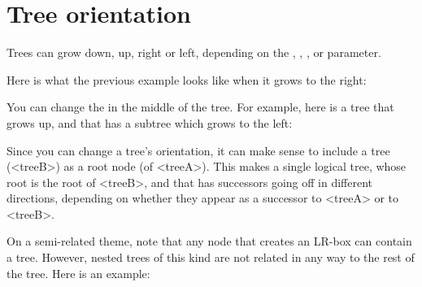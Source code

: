 \documentclass[fontsize=11pt,english,BCOR=10mm,DIV=12,bibliography=totoc,parskip=false,
   headings=small, headinclude=false,footinclude=false,oneside]{pst-doc}
\begin{document}
\section{Tree orientation}

Trees can grow down, up, right or left, depending on the 
, , , or  parameter.

Here is what the previous example looks like when it grows to the right:

\begin{LTXexample}[pos=l,width=0.4\linewidth]
\end{LTXexample}


You can change the  in the middle of the tree.
For example, here is a tree that grows up, and that has a subtree which grows
to the left:

\begin{LTXexample}[pos=l,width=0.4\linewidth]
  \footnotesize
\end{LTXexample}

Since you can change a tree's orientation, it can make sense to include a tree
(<treeB>) as a root node (of <treeA>). This makes a single logical tree, whose
root is the root of <treeB>, and that has successors going off in different
directions, depending on whether they appear as a successor to <treeA> or to
<treeB>.

\begin{LTXexample}[pos=l,width=0.4\linewidth]
\end{LTXexample}


On a semi-related theme, note that any node that creates an LR-box can contain
a tree. However, nested trees of this kind are not related in any way to the
rest of the tree. Here is an example:

\begin{LTXexample}[pos=l,width=0.4\linewidth]
    \TC
    \TC
  \endpsTree
\end{LTXexample}
\end{document}
